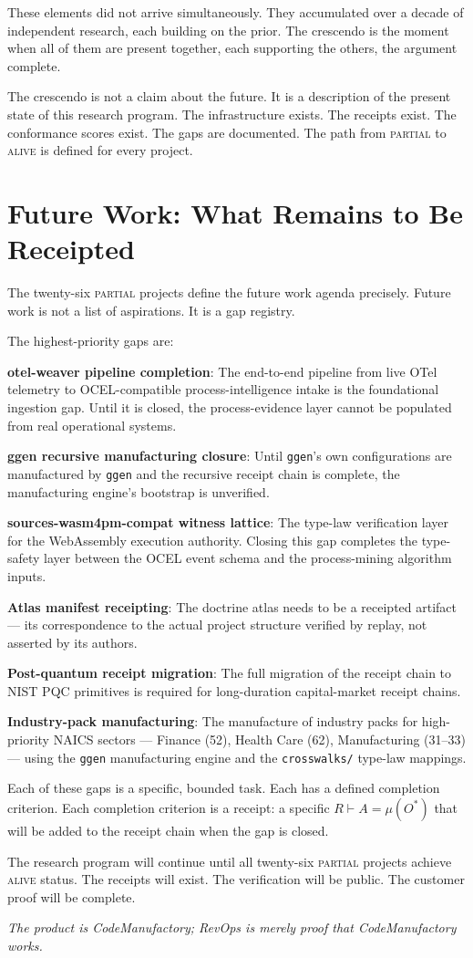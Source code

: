 These elements did not arrive simultaneously. They accumulated over a decade of independent research, each building on the prior. The crescendo is the moment when all of them are present together, each supporting the others, the argument complete.

The crescendo is not a claim about the future. It is a description of the present state of this research program. The infrastructure exists. The receipts exist. The conformance scores exist. The gaps are documented. The path from \textsc{partial} to \textsc{alive} is defined for every project.

\section{Future Work: What Remains to Be Receipted}

The twenty-six \textsc{partial} projects define the future work agenda precisely. Future work is not a list of aspirations. It is a gap registry.

The highest-priority gaps are:

\textbf{otel-weaver pipeline completion}: The end-to-end pipeline from live OTel telemetry to OCEL-compatible process-intelligence intake is the foundational ingestion gap. Until it is closed, the process-evidence layer cannot be populated from real operational systems.

\textbf{ggen recursive manufacturing closure}: Until \texttt{ggen}'s own configurations are manufactured by \texttt{ggen} and the recursive receipt chain is complete, the manufacturing engine's bootstrap is unverified.

\textbf{sources-wasm4pm-compat witness lattice}: The type-law verification layer for the WebAssembly execution authority. Closing this gap completes the type-safety layer between the OCEL event schema and the process-mining algorithm inputs.

\textbf{Atlas manifest receipting}: The doctrine atlas needs to be a receipted artifact --- its correspondence to the actual project structure verified by replay, not asserted by its authors.

\textbf{Post-quantum receipt migration}: The full migration of the receipt chain to NIST PQC primitives is required for long-duration capital-market receipt chains.

\textbf{Industry-pack manufacturing}: The manufacture of industry packs for high-priority NAICS sectors --- Finance (52), Health Care (62), Manufacturing (31--33) --- using the \texttt{ggen} manufacturing engine and the \texttt{crosswalks/} type-law mappings.

Each of these gaps is a specific, bounded task. Each has a defined completion criterion. Each completion criterion is a receipt: a specific $R \vdash A = \mu(O^{*})$ that will be added to the receipt chain when the gap is closed.

The research program will continue until all twenty-six \textsc{partial} projects achieve \textsc{alive} status. The receipts will exist. The verification will be public. The customer proof will be complete.

\bigskip
\noindent\textit{The product is CodeManufactory; RevOps is merely proof that CodeManufactory works.}
